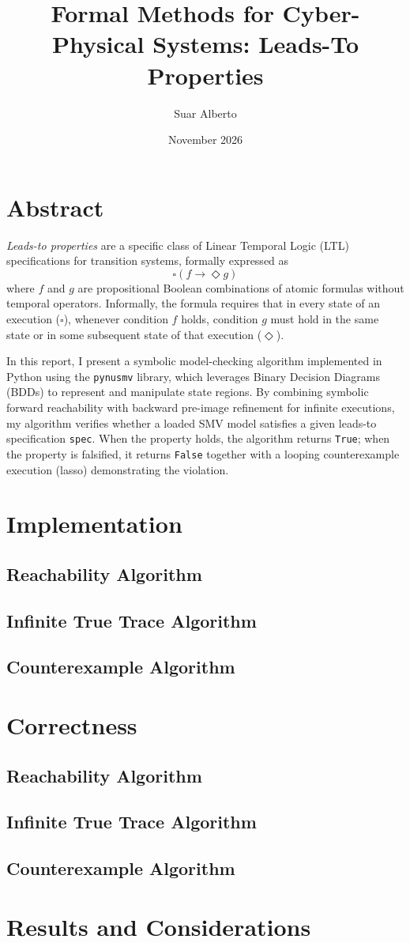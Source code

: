 \documentclass{article}
\title{Formal Methods for Cyber-Physical Systems: Leads-To Properties}
\author{Suar Alberto}
\date{November 2026}
\begin{document}
\maketitle

\section*{Abstract}
\textit{Leads-to properties} are a specific class of Linear Temporal Logic (LTL) specifications for transition systems, formally expressed as
\[
\square(f \rightarrow \Diamond g)
\]
where $f$ and $g$ are propositional Boolean combinations of atomic formulas without temporal operators. Informally, the formula requires that in every state of an execution ($\square$), whenever condition $f$ holds, condition $g$ must hold in the same state or in some subsequent state of that execution ($\Diamond$).

In this report, I present a symbolic model-checking algorithm implemented in Python using the \texttt{pynusmv} library, which leverages Binary Decision Diagrams (BDDs) to represent and manipulate state regions. By combining symbolic forward reachability with backward pre-image refinement for infinite executions, my algorithm verifies whether a loaded SMV model satisfies a given leads-to specification \texttt{spec}. When the property holds, the algorithm returns \texttt{True}; when the property is falsified, it returns \texttt{False} together with a looping counterexample execution (lasso) demonstrating the violation.
\section{Implementation}
\subsection{Reachability Algorithm}
\subsection{Infinite True Trace Algorithm}
\subsection{Counterexample Algorithm}
\section{Correctness}
\subsection{Reachability Algorithm}
\subsection{Infinite True Trace Algorithm}
\subsection{Counterexample Algorithm}
\section{Results and Considerations}
\end{document}
